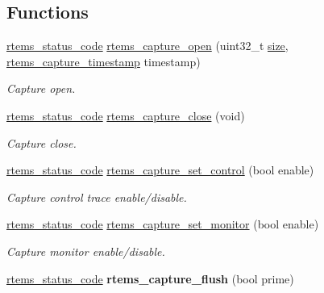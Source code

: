 \subsection*{Functions}
\begin{DoxyCompactItemize}
\item 
\mbox{\hyperlink{group__ClassicStatus_ga545d41846817eaba6143d52ee4d9e9fe}{rtems\+\_\+status\+\_\+code}} \mbox{\hyperlink{group__libmisc__capture_ga97f17a645e1379b42249b0b3b109e3bb}{rtems\+\_\+capture\+\_\+open}} (uint32\+\_\+t \mbox{\hyperlink{sun4u_2tte_8h_a245260f6f74972558f61b85227df5aae}{size}}, \mbox{\hyperlink{group__libmisc__capture_gab70845b819ef4c8c57f4f46ce276f0dd}{rtems\+\_\+capture\+\_\+timestamp}} timestamp)
\begin{DoxyCompactList}\small\item\em Capture open. \end{DoxyCompactList}\item 
\mbox{\hyperlink{group__ClassicStatus_ga545d41846817eaba6143d52ee4d9e9fe}{rtems\+\_\+status\+\_\+code}} \mbox{\hyperlink{group__libmisc__capture_ga57b44945c2da07711529761d91af585a}{rtems\+\_\+capture\+\_\+close}} (void)
\begin{DoxyCompactList}\small\item\em Capture close. \end{DoxyCompactList}\item 
\mbox{\hyperlink{group__ClassicStatus_ga545d41846817eaba6143d52ee4d9e9fe}{rtems\+\_\+status\+\_\+code}} \mbox{\hyperlink{group__libmisc__capture_ga93fda7c6a8537647f1236d2914f3fc98}{rtems\+\_\+capture\+\_\+set\+\_\+control}} (bool enable)
\begin{DoxyCompactList}\small\item\em Capture control trace enable/disable. \end{DoxyCompactList}\item 
\mbox{\hyperlink{group__ClassicStatus_ga545d41846817eaba6143d52ee4d9e9fe}{rtems\+\_\+status\+\_\+code}} \mbox{\hyperlink{group__libmisc__capture_ga11c38aa44af23dfe0e8b1cd88c01eebd}{rtems\+\_\+capture\+\_\+set\+\_\+monitor}} (bool enable)
\begin{DoxyCompactList}\small\item\em Capture monitor enable/disable. \end{DoxyCompactList}\item 
\mbox{\label{group__libmisc__capture_ga93404ccea3bd416cf9cc6999fdbea424}} 
\mbox{\hyperlink{group__ClassicStatus_ga545d41846817eaba6143d52ee4d9e9fe}{rtems\+\_\+status\+\_\+code}} {\bfseries rtems\+\_\+capture\+\_\+flush} (bool prime)

\end{DoxyCompactItemize}
